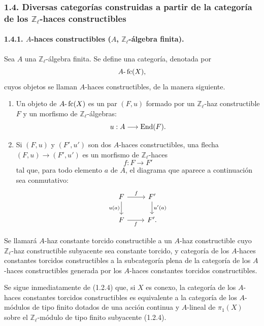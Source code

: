 \subsubsection*{1.4. Diversas categorías construidas a partir de la categoría de los \(\mathbb Z_\ell\)-haces constructibles}

\paragraph{1.4.1. \(A\)-haces constructibles (\(A\), \(\mathbb Z_\ell\)-álgebra finita).}
Sea \(A\) una \(\mathbb Z_\ell\)-álgebra finita. Se define una categoría, denotada por
\[
A\text{-}\operatorname{fc}(X),
\]
cuyos objetos se llaman \(A\)-haces constructibles, de la manera siguiente.

\begin{enumerate}[label=(\roman*)]
\item Un objeto de \(A\text{-}\operatorname{fc}(X)\) es un par \((F,u)\) formado por un \(\mathbb Z_\ell\)-haz constructible \(F\) y un morfismo de \(\mathbb Z_\ell\)-álgebras:
\[
u:A\longrightarrow \operatorname{End}(F).
\]
\item Si \((F,u)\) y \((F',u')\) son dos \(A\)-haces constructibles, una flecha \((F,u)\to(F',u')\) es un morfismo de \(\mathbb Z_\ell\)-haces
\[
f:F\longrightarrow F'
\]
tal que, para todo elemento \(a\) de \(A\), el diagrama que aparece a continuación sea conmutativo:
\[
\begin{tikzcd}
F \arrow[r,"f"] \arrow[d,"u(a)"'] & F' \arrow[d,"u'(a)"]\\
F \arrow[r,"f"'] & F'.
\end{tikzcd}
\]
\end{enumerate}

Se llamará \(A\)-haz constante torcido constructible a un \(A\)-haz constructible cuyo \(\mathbb Z_\ell\)-haz constructible subyacente sea constante torcido, y categoría de los \(A\)-haces constantes torcidos constructibles a la subcategoría plena de la categoría de los \(A\)-haces constructibles generada por los \(A\)-haces constantes torcidos constructibles.

Se sigue inmediatamente de (1.2.4) que, si \(X\) es conexo, la categoría de los \(A\)-haces constantes torcidos constructibles es equivalente a la categoría de los \(A\)-módulos de tipo finito dotados de una acción continua y \(A\)-lineal de \(\pi_1(X)\) sobre el \(\mathbb Z_\ell\)-módulo de tipo finito subyacente (1.2.4).
